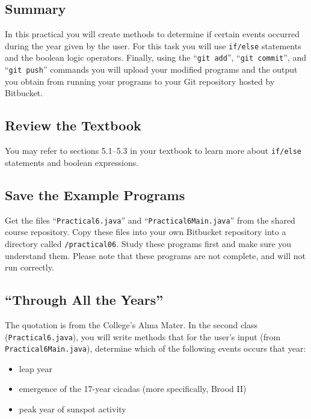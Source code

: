 




\subsection*{Summary}
\vspace*{-.05in}

In this practical you will create methods to determine if certain events occurred during the year given by the user. For
this task you will use {\tt if/else} statements and the boolean logic operators.  Finally, using the ``{\tt git add}'',
``{\tt git  commit}'', and ``{\tt git push}'' commands you will upload your modified programs and the output you obtain
from running your programs to your Git repository hosted by Bitbucket.  

\vspace*{-.1in}
\subsection*{Review the Textbook}
\vspace*{-.05in}

You may refer to sections 5.1--5.3 in your textbook to learn more about {\tt if/else} statements and boolean expressions. 

\vspace*{-.1in}
\subsection*{Save the Example Programs}
\vspace*{-.05in}
Get the files ``{\tt Practical6.java}'' and ``{\tt Practical6Main.java}'' from the shared course repository. Copy these files 
into your own Bitbucket repository into a directory called {\tt /practical06}. Study 
these programs first and make sure you understand them. Please note that these programs are not complete, and will not run correctly.

\vspace*{-.1in}
\subsection*{``Through All the Years''}
\vspace*{-.05in}
The quotation is from the College's Alma Mater. In the second class ({\tt Practical6.java}), you will write methods that for the user's input (from {\tt Practical6Main.java}), determine 
which of the following events occurs that year:
\begin{itemize}
\item
leap year
\item
emergence of the 17-year cicadas (more specifically, Brood II)
\item
peak year of sunspot activity
\end{itemize}

